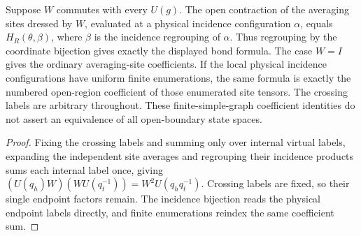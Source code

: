 \begin{lemma}%
    \label{thm:peps_graph_open_averaging_bond_state}
    \leanok
    Suppose $W$ commutes with every $U(g)$. The open contraction of
    the averaging sites dressed by $W$, evaluated at a physical incidence
    configuration $\alpha$, equals $H_R(\theta,\beta)$, where $\beta$ is
    the incidence regrouping of $\alpha$. Thus regrouping by the coordinate
    bijection gives exactly the displayed bond formula. The case $W=I$
    gives the ordinary averaging-site coefficients. If the local physical
    incidence configurations have uniform finite enumerations, the same
    formula is exactly the numbered open-region coefficient of those
    enumerated site tensors. The crossing labels are arbitrary throughout.
    These finite-simple-graph coefficient identities do not assert an
    equivalence of all open-boundary state spaces.
\end{lemma}

\begin{proof}\leanok
    Fixing the crossing labels and summing only over internal virtual labels,
    expanding the independent site averages and regrouping their incidence
    products sums each internal label once, giving
    $(U(q_h)W)(WU(q_t^{-1}))=W^2U(q_hq_t^{-1})$.
    Crossing labels are fixed, so their single endpoint factors remain.
    The incidence bijection reads the physical endpoint labels directly, and
    finite enumerations reindex the same coefficient sum.
\end{proof}
